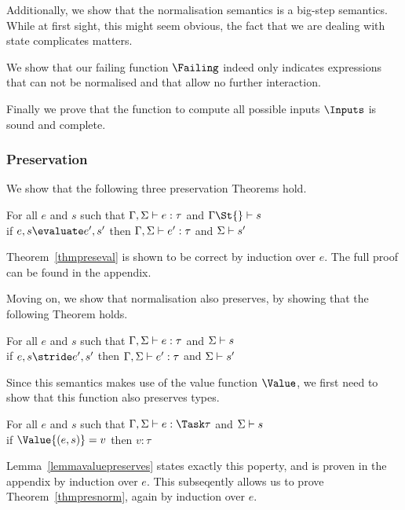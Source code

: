 Additionally, we show that the normalisation semantics is a big-step semantics.
While at first sight, this might seem obvious, the fact that we are dealing with
state complicates matters.

We show that our failing function $\Failing$ indeed only indicates expressions
that can not be normalised and that allow no further interaction.

Finally we prove that the function to compute all possible inputs $\Inputs$ is sound and complete.
\subsubsection{Preservation}

We show that the following three preservation Theorems hold.

\begin{theorem}
      For all $e$ and $s$ such that
      $\Gamma,\Sigma\vdash e:\tau$ and $\Gamma\St{}\infers s$\\
      if $e,s\evaluate e',s'$
      then $\Gamma,\Sigma\vdash e':\tau$ and $\Sigma\vdash s'$
      \label{thmpreseval}
\end{theorem}

Theorem~\ref{thmpreseval} is shown to be correct by induction over $e$. The full
proof can be found in the appendix.


Moving on, we show that normalisation also preserves, by showing that the
following Theorem holds.

\begin{theorem}
    For all $e$ and $s$ such that $\Gamma,\Sigma\vdash e:\tau$ and $\Sigma\vdash s$\\
    if   $e,s \stride e',s'$ then $\Gamma,\Sigma\vdash e':\tau$ and $\Sigma\vdash s'$
    \label{thmpresnorm}
\end{theorem}

Since this semantics makes use of the value function $\Value$, we first need to
show that this function also preserves types.

\begin{lemma}
  For all $e$ and $s$ such that $\Gamma,\Sigma\infers e:\Task\tau$ and $\Sigma\vdash s$\\
  if $\Value{(e,s)}=v$ then $v:\tau$
  \label{lemmavaluepreserves}
\end{lemma}

Lemma~\ref{lemmavaluepreserves} states exactly this poperty, and is proven in the
appendix by induction over $e$. This subseqently allows us to prove
Theorem~\ref{thmpresnorm}, again by induction over $e$.

